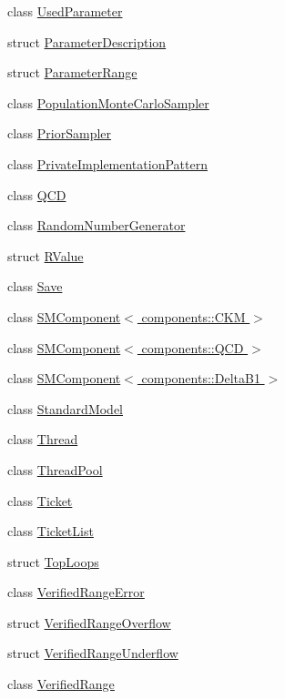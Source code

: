 \begin{DoxyCompactItemize}
\item 
class \hyperlink{classeos_1_1UsedParameter}{UsedParameter}
\item 
struct \hyperlink{structeos_1_1ParameterDescription}{ParameterDescription}
\item 
struct \hyperlink{structeos_1_1ParameterRange}{ParameterRange}
\item 
class \hyperlink{classeos_1_1PopulationMonteCarloSampler}{PopulationMonteCarloSampler}
\item 
class \hyperlink{classeos_1_1PriorSampler}{PriorSampler}
\item 
class \hyperlink{classeos_1_1PrivateImplementationPattern}{PrivateImplementationPattern}
\item 
class \hyperlink{classeos_1_1QCD}{QCD}
\item 
class \hyperlink{classeos_1_1RandomNumberGenerator}{RandomNumberGenerator}
\item 
struct \hyperlink{structeos_1_1RValue}{RValue}
\item 
class \hyperlink{classeos_1_1Save}{Save}
\item 
class \hyperlink{classeos_1_1SMComponent_3_01components_1_1CKM_01_4}{SMComponent$<$ components::CKM $>$}
\item 
class \hyperlink{classeos_1_1SMComponent_3_01components_1_1QCD_01_4}{SMComponent$<$ components::QCD $>$}
\item 
class \hyperlink{classeos_1_1SMComponent_3_01components_1_1DeltaB1_01_4}{SMComponent$<$ components::DeltaB1 $>$}
\item 
class \hyperlink{classeos_1_1StandardModel}{StandardModel}
\item 
class \hyperlink{classeos_1_1Thread}{Thread}
\item 
class \hyperlink{classeos_1_1ThreadPool}{ThreadPool}
\item 
class \hyperlink{classeos_1_1Ticket}{Ticket}
\item 
class \hyperlink{classeos_1_1TicketList}{TicketList}
\item 
struct \hyperlink{structeos_1_1TopLoops}{TopLoops}
\item 
class \hyperlink{classeos_1_1VerifiedRangeError}{VerifiedRangeError}
\item 
struct \hyperlink{structeos_1_1VerifiedRangeOverflow}{VerifiedRangeOverflow}
\item 
struct \hyperlink{structeos_1_1VerifiedRangeUnderflow}{VerifiedRangeUnderflow}
\item 
class \hyperlink{classeos_1_1VerifiedRange}{VerifiedRange}

\end{DoxyCompactItemize}
